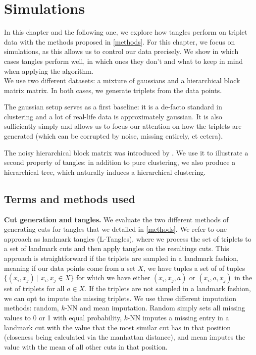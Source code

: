 \chapter{Simulations}\label{simulations}
In this chapter and the following one, we explore how tangles perform on triplet data with the methods proposed in \autoref{methods}. 
For this chapter, we focus on simulations, as this allows us to control our data precisely.  
We show in which cases tangles perform well, in which ones they don't and what to keep in mind when applying the algorithm. \\

We use two different datasets: a mixture of gaussians and a hierarchical block matrix matrix. In both cases, we generate triplets from the data points.

The gaussian setup serves as a first baseline: it is a de-facto standard in clustering and a lot of real-life data is approximately gaussian. 
It is also sufficiently simply and allows us to focus our attention on how the triplets are generated (which can be corrupted by noise, missing entirely, et cetera). 

The noisy hierarchical block matrix was introduced by \cite{balakrishnanNoiseThresholdsSpectral2011}.
We use it to illustrate a second property of tangles: in addition to pure clustering, we also produce a hierarchical tree, 
which naturally induces a hierarchical clustering. 

\section{Terms and methods used}
\textbf{Cut generation and tangles.} We evaluate the two different methods of generating cuts for tangles that we detailed in \autoref{methods}. 
We refer to one approach as landmark tangles (L-Tangles), where we process the set of triplets to a set of landmark cuts and then apply tangles on the resultings cuts.
This approach is straightforward if the triplets are sampled in a landmark fashion, meaning if our data points come from a set $X$, 
we have tuples a set of of tuples $\{ (x_i, x_j)  \mid  x_i, x_j \in X \}$ for which we have either $(x_i, x_j, a)$ or $(x_i, a, x_j)$ in the set of triplets for all $a \in X$.
If the triplets are not sampled in a landmark fashion, we can opt to impute the missing triplets. We use three different imputation methods: random, $k$-NN and mean imputation.
Random simply sets all missing values to 0 or 1 with equal probability, $k$-NN imputes
a missing entry in a landmark cut with the value that the most similar cut has in that position (closeness being calculated via the manhattan distance), and mean 
imputes the value with the mean of all other cuts in that position. 

